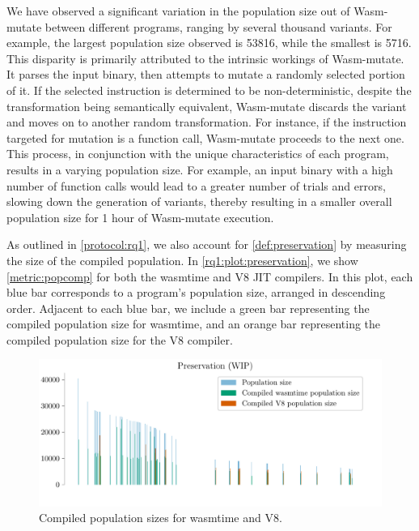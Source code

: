 \documentclass[sigplan,screen]{acmart}
\newcommand{\tool}{Wasm-mutate\xspace}
\begin{document}
We have observed a significant variation in the population size out of \tool between different programs, ranging by several thousand variants. 
For example, the largest population size observed is 53816, while the smallest is 5716.
This disparity is primarily attributed to the intrinsic workings of \tool. 
It parses the input binary, then attempts to mutate a randomly selected portion of it. 
If the selected instruction is determined to be non-deterministic, despite the transformation being semantically equivalent, \tool discards the variant and moves on to another random transformation.
For instance, if the instruction targeted for mutation is a function call, \tool proceeds to the next one.
This process, in conjunction with the unique characteristics of each program, results in a varying population size. 
For example, an input binary with a high number of function calls would lead to a greater number of trials and errors, slowing down the generation of variants, thereby resulting in a smaller overall population size for 1 hour of \tool execution.

As outlined in \autoref{protocol:rq1}, we also account for \autoref{def:preservation} by measuring the size of the compiled population. 
In \autoref{rq1:plot:preservation}, we show \autoref{metric:popcomp} for both the wasmtime and V8 JIT compilers.
In this plot, each blue bar corresponds to a program's population size, arranged in descending order. 
Adjacent to each blue bar, we include a green bar representing the compiled population size for wasmtime, and an orange bar representing the compiled population size for the V8 compiler.


\begin{figure}
    \centering
    \includegraphics[width=\linewidth]{plots/rq1/preservation.pdf}
    \caption{Compiled population sizes for wasmtime and V8.}
  \label{rq1:plot:preservation}
\end{figure}
\end{document}
